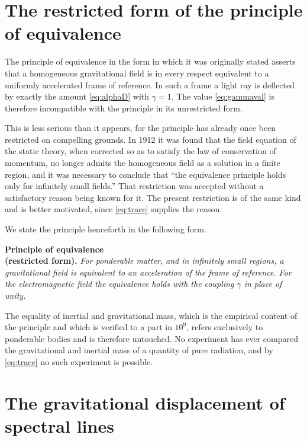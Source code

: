 \documentclass[aps,prd,reprint,amsmath,amssymb,nofootinbib,longbibliography]{revtex4-2}
\begin{document}
\section{The restricted form of the principle of equivalence}

The principle of equivalence in the form in which it was originally stated \cite{ein1907} asserts
that a homogeneous gravitational field is in every respect equivalent to a uniformly accelerated
frame of reference. In such a frame a light ray is deflected by exactly the amount \eqref{eq:alphaD}
with $\gamma = 1$. The value \eqref{eq:gammaval} is therefore incompatible with the principle in its
unrestricted form.

This is less serious than it appears, for the principle has already once been restricted on
compelling grounds. In 1912 \cite{ein1912b} it was found that the field equation of the static
theory, when corrected so as to satisfy the law of conservation of momentum, no longer admits the
homogeneous field as a solution in a finite region, and it was necessary to conclude that ``the
equivalence principle holds only for infinitely small fields.'' That restriction was accepted
without a satisfactory reason being known for it. The present restriction is of the same kind and
is better motivated, since \eqref{eq:trace} supplies the reason.

We state the principle henceforth in the following form.

\medskip
\noindent\textbf{Principle of equivalence\\ (restricted form).}
\emph{For ponderable matter, and in infinitely small regions, a gravitational field is equivalent to
an acceleration of the frame of reference. For the electromagnetic field the equivalence holds with
the coupling $\gamma$ in place of unity.}
\medskip

The equality of inertial and gravitational mass, which is the empirical content of the principle and
which is verified to a part in $10^{9}$, refers exclusively to ponderable bodies and is therefore
untouched. No experiment has ever compared the gravitational and inertial mass of a quantity of pure
radiation, and by \eqref{eq:trace} no such experiment is possible.

\section{The gravitational displacement of spectral lines}
\end{document}
